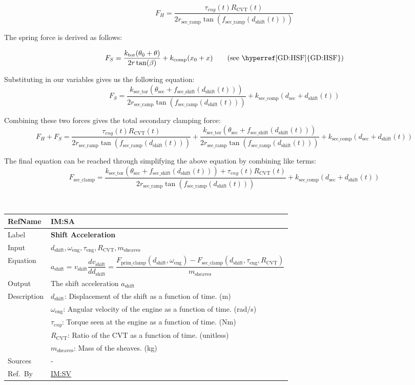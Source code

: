 \documentclass[12pt]{article}
\newcommand{\colAwidth}{0.13\textwidth}
\newcommand{\colBwidth}{0.82\textwidth}
\newcommand{\hpref}[1]{\hyperref[#1]{#1}}
\newcommand{\definstance}[8] {
~\newline
\noindent
\begin{minipage}{\textwidth}
\renewcommand*{\arraystretch}{1.5}
\begin{tabular}{| p{\colAwidth} | p{\colBwidth}|}
  \hline
  \rowcolor[gray]{0.9}
  RefName& \textbf{#1} \label{#1}\\
  \hline
  Label& \bf #2 \\
  \hline
  Input& #3\\
  \hline
  Equation& #4\\
  \hline
  Output& #5\\
  \hline
  Description& #6 \\
  \hline
  Sources& #7 \\
  \hline
  Ref.\ By & #8\\
  \hline
\end{tabular}
\end{minipage}\\
}
\begin{document}
\[
F_H = \frac{\tau_{eng}(t) R_{\text{CVT}}(t)}{2 r_{\text{sec\_ramp}} \tan(f_{\text{sec\_ramp}}(d_\text{shift}(t)))}
\]

The spring force is derived as follows:

\[
F_S = \frac{k_{\text{tor}}(\theta_0 + \theta)}{2r\tan(\beta)} + k_\text{comp}(x_0 + x) \tag*{\text{(see \hpref{GD:HSF})}} %
\]

Substituting in our variables gives us the following equation:
\[
F_S = \frac{k_{\text{sec\_tor}} (\theta_{\text{sec}} + f_{\text{sec\_shift}}(d_\text{shift}(t)))}{2 r_{\text{sec\_ramp}} \tan(f_{\text{sec\_ramp}}(d_\text{shift}(t)))} + k_{\text{sec\_comp}} (d_{\text{sec}} + d_\text{shift}(t))
\]

Combining these two forces gives the total secondary clamping force:
\[
F_H + F_S = \frac{\tau_{eng}(t) R_{\text{CVT}}(t)}{2 r_{\text{sec\_ramp}} \tan(f_{\text{sec\_ramp}}(d_\text{shift}(t)))} + \frac{k_{\text{sec\_tor}} (\theta_{\text{sec}} + f_{\text{sec\_shift}}(d_\text{shift}(t)))}{2 r_{\text{sec\_ramp}} \tan(f_{\text{sec\_ramp}}(d_\text{shift}(t)))} + k_{\text{sec\_comp}} (d_{\text{sec}} + d_\text{shift}(t))
\]

The final equation can be reached through simplifying the above equation by combining like terms:
\[
F_{\text{sec\_clamp}} = \frac{k_{\text{sec\_tor}} (\theta_{\text{sec}} + f_{\text{sec\_shift}}(d_\text{shift}(t))) + \tau_{eng}(t) R_{\text{CVT}}(t)}{2 r_{\text{sec\_ramp}} \tan(f_{\text{sec\_ramp}}(d_\text{shift}(t)))} + k_{\text{sec\_comp}} (d_{\text{sec}} + d_\text{shift}(t))
\]

\definstance
{IM:SA}
{Shift Acceleration}
{$d_\text{shift}, \omega_\text{eng}, \tau_\text{eng}, R_{\text{CVT}}, m_\text{sheaves}$} %
{\[
a_\text{shift} = v_\text{shift}\frac{dv_\text{shift}}{dd_\text{shift}} = \frac{F_{\text{prim\_clamp}}(d_\text{shift}, \omega_\text{eng}) - F_{\text{sec\_clamp}}(d_\text{shift}, \tau_\text{eng}, R_{\text{CVT}})}{m_\text{sheaves}}
\]} %
{The shift acceleration $a_\text{shift}$} %
{
  $d_\text{shift}$: Displacement of the shift as a function of time. (m)\\
  &$\omega_\text{eng}$: Angular velocity of the engine as a function of time. (rad/s)\\
  &$\tau_{eng}$: Torque seen at the engine as a function of time. (Nm) \\
  &$R_{\text{CVT}}$: Ratio of the CVT as a function of time. (unitless) \\
  &$m_\text{sheaves}$: Mass of the sheaves. (kg)
} %
{-}
{\hpref{IM:SV}}
\end{document}
